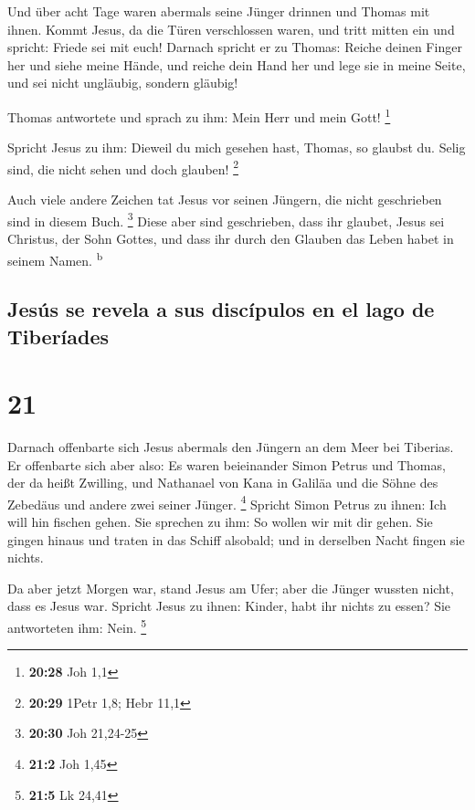  Und über acht Tage waren abermals seine Jünger drinnen
und Thomas mit ihnen. Kommt Jesus, da die Türen verschlossen waren, und
tritt mitten ein und spricht: Friede sei mit euch! 
Darnach spricht er zu Thomas: Reiche deinen Finger her und siehe meine
Hände, und reiche dein Hand her und lege sie in meine Seite, und sei
nicht ungläubig, sondern gläubig!

 Thomas antwortete und sprach zu ihm: Mein Herr und mein
Gott! \footnote{\textbf{20:28} Joh 1,1}

 Spricht Jesus zu ihm: Dieweil du mich gesehen hast,
Thomas, so glaubst du. Selig sind, die nicht sehen und doch glauben!
\footnote{\textbf{20:29} 1Petr 1,8; Hebr 11,1}

 Auch viele andere Zeichen tat Jesus vor seinen Jüngern,
die nicht geschrieben sind in diesem Buch. \footnote{\textbf{20:30} Joh
  21,24-25}  Diese aber sind geschrieben, dass ihr
glaubet, Jesus sei Christus, der Sohn Gottes, und dass ihr durch den
Glauben das Leben habet in seinem Namen. \textsuperscript{b}

\hypertarget{jesuxfas-se-revela-a-sus-discuxedpulos-en-el-lago-de-tiberuxedades}{%
\subsection{Jesús se revela a sus discípulos en el lago de
Tiberíades}\label{jesuxfas-se-revela-a-sus-discuxedpulos-en-el-lago-de-tiberuxedades}}

\hypertarget{section-20}{%
\section{21}\label{section-20}}

 Darnach offenbarte sich Jesus abermals den Jüngern an dem
Meer bei Tiberias. Er offenbarte sich aber also:  Es waren
beieinander Simon Petrus und Thomas, der da heißt Zwilling, und
Nathanael von Kana in Galiläa und die Söhne des Zebedäus und andere zwei
seiner Jünger. \footnote{\textbf{21:2} Joh 1,45}  Spricht
Simon Petrus zu ihnen: Ich will hin fischen gehen. Sie sprechen zu ihm:
So wollen wir mit dir gehen. Sie gingen hinaus und traten in das Schiff
alsobald; und in derselben Nacht fingen sie nichts.

 Da aber jetzt Morgen war, stand Jesus am Ufer; aber die
Jünger wussten nicht, dass es Jesus war.  Spricht Jesus zu
ihnen: Kinder, habt ihr nichts zu essen? Sie antworteten ihm: Nein.
\footnote{\textbf{21:5} Lk 24,41}

